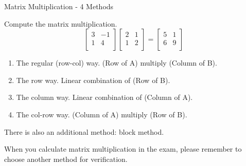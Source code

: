 \documentclass{beamer}
\begin{document}
\begin{frame}{Matrix Multiplication - 4 Methods}
\begin{examples}
Compute the matrix multiplication.
    \begin{equation*}
        \left[ \begin{matrix}
            3&		-1\\
            1&		4\\
        \end{matrix} \right] \left[ \begin{matrix}
            2&		1\\
            1&		2\\
        \end{matrix} \right] =\left[ \begin{matrix}
            5&		1\\
            6&		9\\
        \end{matrix} \right]
    \end{equation*}
\end{examples}




\begin{enumerate}
    \item The regular (row-col) way. (Row of A) multiply (Column of B).
    \item The row way. Linear combination of (Row of B).
    \item The column way. Linear combination of (Column of A).
    \item The col-row way. (Column of A) multiply (Row of B).
\end{enumerate}

There is also an additional method: block method.

\vspace{3pt}
When you calculate matrix multiplication in the exam, please remember to choose another method for verification.
\end{frame}
\end{document}
